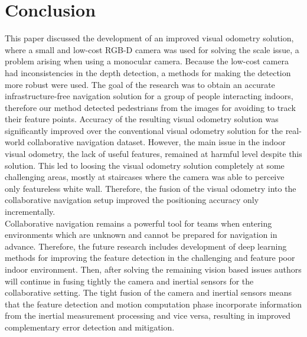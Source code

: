 \chapter{Conclusion}
\setcounter{equation}{1}   

This paper discussed the development of an improved visual
odometry solution, where a small and low-cost RGB-D camera
was used for solving the scale issue, a problem arising when
using a monocular camera. Because the low-cost camera
had inconsistencies in the depth detection, a methods for
making the detection more robust were used. The goal of
the research was to obtain an accurate infrastructure-free
navigation solution for a group of people interacting indoors,
therefore our method detected pedestrians from the images for
avoiding to track their feature points. Accuracy of the resulting
visual odometry solution was significantly improved over the
conventional visual odometry solution for the real-world collaborative navigation dataset. However, the main issue in the
indoor visual odometry, the lack of useful features, remained
at harmful level despite this solution. This led to loosing
the visual odometry solution completely at some challenging
areas, mostly at staircases where the camera was able to
perceive only featureless white wall. Therefore, the fusion of
the visual odometry into the collaborative navigation setup
improved the positioning accuracy only incrementally.\\
Collaborative navigation remains a powerful tool for teams
when entering environments which are unknown and cannot
be prepared for navigation in advance. Therefore, the future
research includes development of deep learning methods for
improving the feature detection in the challenging and feature
poor indoor environment. Then, after solving the remaining
vision based issues authors will continue in fusing tightly the
camera and inertial sensors for the collaborative setting. The
tight fusion of the camera and inertial sensors means that the
feature detection and motion computation phase incorporate
information from the inertial measurement processing and vice
versa, resulting in improved complementary error detection
and mitigation.
